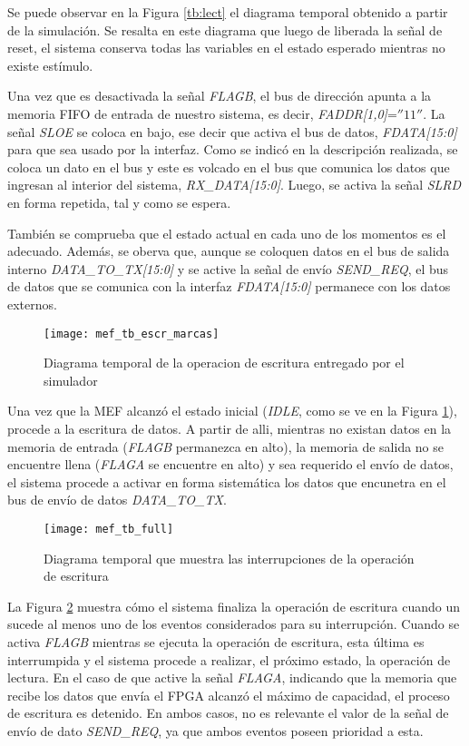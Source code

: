 Se puede observar en la Figura \ref{tb:lect} el diagrama temporal obtenido a partir de la simulación. Se resalta en este diagrama que luego de liberada la señal de reset, el sistema conserva todas las variables en el estado esperado mientras no existe estímulo.

Una vez que es desactivada la señal {\it FLAGB}, el bus de dirección apunta a la memoria FIFO de entrada de nuestro sistema, es decir, {\it FADDR[1,0]}=$''11''$. La señal {\it SLOE} se coloca en bajo, ese decir que activa el bus de datos, {\it FDATA[15:0]} para que sea usado por la interfaz. Como se indicó en la descripción realizada, se coloca un dato en el bus y este es volcado en el bus que comunica los datos que ingresan al interior del sistema, {\it RX\_DATA[15:0]}. Luego, se activa la señal {\it SLRD} en forma repetida, tal y como se espera.

También se comprueba que el estado actual en cada uno de los momentos es el adecuado. Además, se oberva que, aunque se coloquen datos en el bus de salida interno {\it DATA\_TO\_TX[15:0]} y se active la señal de envío
{\it SEND\_REQ}, el bus de datos que se comunica con la interfaz {\it FDATA[15:0]} permanece con los datos externos.

\begin{figure}[b]
	\centering
	\texttt{[image: mef\_tb\_escr\_marcas]}
	\caption{Diagrama temporal de la operacion de escritura entregado por el simulador}
	\label{tb:escr}
\end{figure}

Una vez que la MEF alcanzó el estado inicial ({\it IDLE}, como se ve en la Figura \ref{tb:escr}), procede a la escritura de datos. A partir de alli, mientras no existan datos en la memoria de entrada ({\it FLAGB} permanezca en alto), la memoria de salida no se encuentre llena ({\it FLAGA} se encuentre en alto) y sea requerido el envío de datos, el sistema procede a activar en forma sistemática los datos que encunetra en el bus de envío de datos {\it DATA\_TO\_TX}.

\begin{figure}[ht]
	\centering
	\texttt{[image: mef\_tb\_full]}
	\caption{Diagrama temporal que muestra las interrupciones de la operación de escritura}
	\label{tb:inter}
\end{figure}

La Figura \ref{tb:inter} muestra cómo el sistema finaliza la operación de escritura cuando un sucede al menos uno de los eventos considerados para su interrupción. Cuando se activa {\it FLAGB} mientras se ejecuta la operación de escritura, esta última es interrumpida y el sistema procede a realizar, el próximo estado, la operación de lectura. En el caso de que active la señal {\it FLAGA}, indicando que la memoria que recibe los datos que envía el FPGA alcanzó el máximo de capacidad, el proceso de escritura es detenido. En ambos casos, no es relevante el valor de la señal de envío de dato {\it SEND\_REQ}, ya que ambos eventos poseen prioridad a esta.
 
